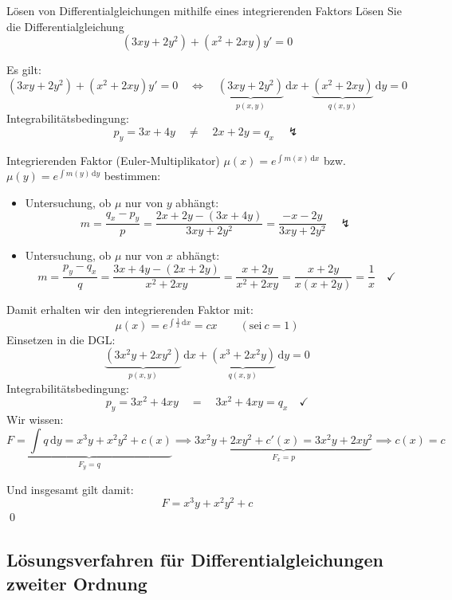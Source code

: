 \documentclass[german]{../spicker}
\renewcommand{\d}{\,\mathrm{d}}
\begin{document}
\begin{example}{Lösen von Differentialgleichungen mithilfe eines integrierenden Faktors}
    Lösen Sie die Differentialgleichung
    $$
        (3xy + 2y^2) + (x^2 + 2xy) y' = 0
    $$

    \exampleseparator

    Es gilt:
    $$
        (3xy + 2y^2) + (x^2 + 2xy) y' = 0 \quad \iff \quad \underbrace{(3xy + 2y^2)}_{p(x, y)}\d x + \underbrace{(x^2 + 2xy)}_{q(x, y)}\d y = 0
    $$
    Integrabilitätsbedingung:
    $$
        p_y = 3x + 4y \quad \neq \quad 2x + 2y = q_x \quad \lightning
    $$

    Integrierenden Faktor (Euler-Multiplikator) $\mu(x) = e^{\int m(x) \d x}$ bzw. $\mu(y) = e^{\int m(y) \d y}$ bestimmen:
    \begin{itemize}
        \item Untersuchung, ob $\mu$ nur von $y$ abhängt:
              $$
                  m = \frac{q_x - p_y}{p} = \frac{2x + 2y - \left(3x + 4y\right)}{3xy + 2y^2} = \frac{-x - 2y}{3xy + 2y^2} \quad \lightning
              $$
        \item Untersuchung, ob $\mu$ nur von $x$ abhängt:
              $$
                  m = \frac{p_y - q_x}{q} = \frac{3x + 4y - (2x + 2y)}{x^2 + 2xy} = \frac{x + 2y}{x^2 + 2xy} = \frac{x+2y}{x(x+2y)} = \frac{1}{x} \quad \checkmark
              $$
    \end{itemize}

    Damit erhalten wir den integrierenden Faktor mit:
    $$
        \mu(x) = e^{\int \frac{1}{x} \d x} = cx \qquad (\text{sei} \ c = 1)
    $$
    Einsetzen in die DGL:
    $$
        \underbrace{\left(3x^2y + 2xy^2\right)}_{p(x, y)}\d x + \underbrace{\left(x^3 + 2x^2y\right)}_{q(x, y)}\d y = 0
    $$
    Integrabilitätsbedingung:
    $$
        p_y = 3x^2 + 4xy \quad = \quad 3x^2 + 4xy = q_x \quad \checkmark
    $$
    Wir wissen:
    $$
        \underbrace{F = \int q \d y = x^3y + x^2y^2 + c(x)}_{F_y = q} \implies \underbrace{3x^2y + 2xy^2 + c'(x) = 3x^2y + 2xy^2}_{F_x = p}  \implies  c(x) = c
    $$

    Und insgesamt gilt damit:
    $$
        F = x^3y + x^2y^2 + c
    $$\qed
\end{example}

\subsection{Lösungsverfahren für Differentialgleichungen zweiter Ordnung}
\end{document}
